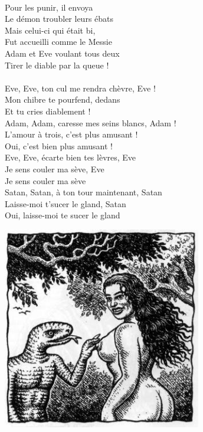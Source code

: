 \\Pour les punir, il envoya 
\\Le démon troubler leurs ébats
\\Mais celui-ci qui était bi, 
\\Fut accueilli comme le Messie
\\Adam et Eve voulant tous deux 
\\Tirer le diable par la queue !
\\\\Eve, Eve, ton cul me rendra chèvre, Eve !
\\Mon chibre te pourfend, dedans 
\\Et tu cries diablement !
\\Adam, Adam, caresse mes seins blancs, Adam !
\\L'amour à trois, c'est plus amusant !
\\Oui, c'est bien plus amusant !
\\Eve, Eve, écarte bien tes lèvres, Eve
\\Je sens couler ma sève, Eve
\\Je sens couler ma sève
\\Satan, Satan, à ton tour maintenant, Satan
\\Laisse-moi t'sucer le gland, Satan
\\Oui, laisse-moi te sucer le gland

\begin{center}
\includegraphics[width=0.65\textwidth]{images/adam_eve.jpg}
\end{center}

\breakpage
